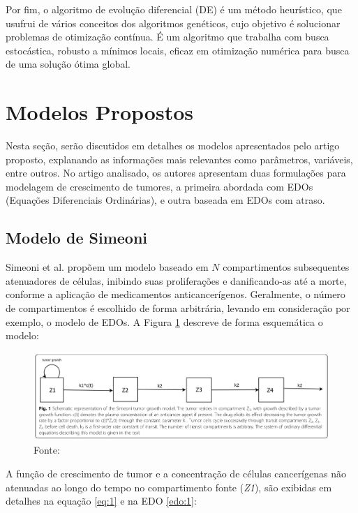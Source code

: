 \documentclass[12pt]{article}
\begin{document}
Por fim, o algoritmo de evolução diferencial (DE) \cite{article} é um método heurístico, que usufrui de vários conceitos dos algoritmos genéticos, cujo objetivo é solucionar problemas de otimização contínua. É um algoritmo que trabalha com busca estocástica, robusto a mínimos locais, eficaz em otimização numérica para busca de uma solução ótima global.

\section{Modelos Propostos} \label{sec:2}

Nesta seção, serão discutidos em detalhes os modelos apresentados pelo artigo proposto, explanando as informações mais relevantes como parâmetros, variáveis, entre outros. No artigo analisado, os autores apresentam duas formulações para modelagem de crescimento de tumores, a primeira abordada com EDOs (Equações Diferenciais Ordinárias), e outra baseada em EDOs com atraso.

\subsection{Modelo de Simeoni}

Simeoni et al. propõem um modelo baseado em \(N\) compartimentos subsequentes atenuadores de células, inibindo suas proliferações e danificando-as até a morte, conforme a aplicação de medicamentos anticancerígenos. Geralmente, o número de compartimentos é escolhido de forma arbitrária, levando em consideração por exemplo, o modelo de EDOs. A Figura \ref{fig:map1} descreve de forma esquemática o modelo: 

\begin{figure}[H]
    \centering
    \includegraphics[width=1\textwidth]{pic/simeoni.png}
    \hspace*{15pt}\hbox{\small Fonte:}\\
    \label{fig:map1}
\end{figure}

A função de crescimento de tumor e a concentração de células cancerígenas não atenuadas ao longo do tempo no compartimento fonte (\emph{Z1}), são exibidas em detalhes na equação \ref{eq:1} e na EDO \ref{edo:1}:
\end{document}
